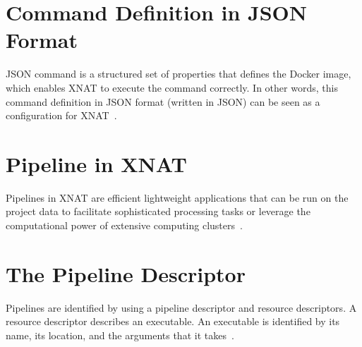 \section{Command Definition in JSON Format}
\ac{JSON} command is a structured set of properties that defines the Docker image, which enables XNAT to execute the command correctly. In other words, this command definition in JSON format (written in JSON) can be seen as a configuration for XNAT~\cite{JSONCommand}.

\section{Pipeline in XNAT}
Pipelines in XNAT are efficient lightweight applications that can be run on the project data to facilitate sophisticated processing tasks or leverage the computational power of extensive computing clusters~\cite{Pipeline}.

\section{The Pipeline Descriptor}

Pipelines are identified by using a pipeline descriptor and resource descriptors. A resource descriptor describes an executable. An executable is identified by its name, its location, and the arguments that it takes~\cite{XNAT_Pipeline_Development_Schema}. 








